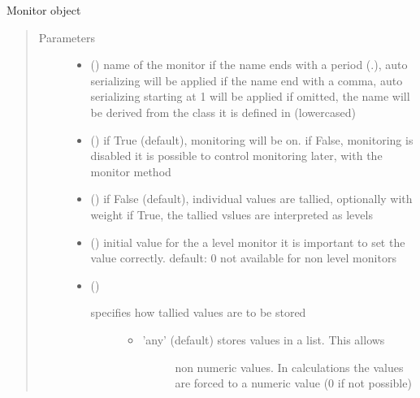 \documentclass[letterpaper,10pt,english]{sphinxmanual}
\begin{document}
\begin{fulllineitems}
\label{\detokenize{Reference:salabim.Monitor}}
Monitor object
\begin{quote}\begin{description}
\item[{Parameters}] \leavevmode\begin{itemize}
\item {} 
 () \textendash{} name of the monitor 
if the name ends with a period (.),
auto serializing will be applied 
if the name end with a comma,
auto serializing starting at 1 will be applied 
if omitted, the name will be derived from the class
it is defined in (lowercased)

\item {} 
 () \textendash{} if True (default), monitoring will be on. 
if False, monitoring is disabled 
it is possible to control monitoring later,
with the monitor method

\item {} 
 () \textendash{} if False (default), individual values are tallied, optionally with weight 
if True, the tallied vslues are interpreted as levels

\item {} 
 (\sphinxstyleliteralemphasis{, }\sphinxstyleliteralemphasis{, }) \textendash{} initial value for the a level monitor 
it is important to set the value correctly.
default: 0 
not available for non level monitors

\item {} 
 () \textendash{} \begin{description}
\item[{specifies how tallied values are to be stored}] \leavevmode\begin{itemize}
\item {} \begin{description}
\item[{’any’ (default) stores values in a list. This allows}] \leavevmode
non numeric values. In calculations the values are
forced to a numeric value (0 if not possible)


\end{description}
\end{itemize}
\end{description}
\end{itemize}
\end{description}
\end{quote}
\end{fulllineitems}
\end{document}
